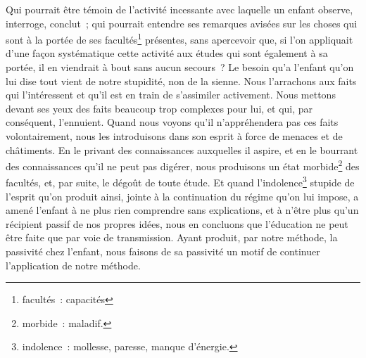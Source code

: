 	{Qui pourrait être témoin de l'activité incessante avec laquelle un enfant observe, interroge, conclut~; qui pourrait entendre ses remarques avisées sur les choses qui sont à la portée de ses facultés\footnote{facultés~: capacités} présentes, sans apercevoir que, si l'on appliquait d'une façon systématique cette activité aux études qui sont également à sa portée, il en viendrait à bout sans aucun secours~? Le besoin qu'a l'enfant qu'on lui dise tout vient de notre stupidité, non de la sienne. Nous l'arrachons aux faits qui l'intéressent et qu'il est en train de s'assimiler activement. Nous mettons devant ses yeux des faits beaucoup trop complexes pour lui, et qui, par conséquent, l'ennuient. Quand nous voyons qu'il n'appréhendera pas ces faits volontairement, nous les introduisons dans son esprit à force de menaces et de châtiments. En le privant des connaissances auxquelles il aspire, et en le bourrant des connaissances qu'il ne peut pas digérer, nous produisons un état morbide\footnote{morbide~: maladif.} des facultés, et, par suite, le dégoût de toute étude. Et quand l'indolence\footnote{indolence~: mollesse, paresse, manque d'énergie.} stupide de l'esprit qu'on produit ainsi, jointe à la continuation du régime qu'on lui impose, a amené l'enfant à ne plus rien comprendre sans explications, et à n'être plus qu'un récipient passif de nos propres idées, nous en concluons que l'éducation ne peut être faite que par voie de transmission. Ayant produit, par notre méthode, la passivité chez l'enfant, nous faisons de sa passivité un motif de continuer l'application de notre méthode.
	}



